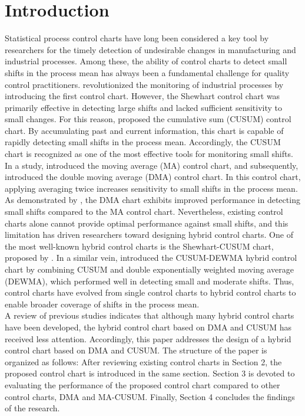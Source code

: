 \documentclass[twoside]{article}
\begin{document}
\section{Introduction}
\vspace{-0.3cm}
Statistical process control charts have long been considered a key tool by researchers for the timely detection of undesirable changes in manufacturing and industrial processes. Among these, the ability of control charts to detect small shifts in the process mean has always been a fundamental challenge for quality control practitioners.  \cite{shewhart1931} revolutionized the monitoring of industrial processes by introducing the first control chart. However, the Shewhart control chart was primarily effective in detecting large shifts and lacked sufficient sensitivity to small  changes.
For this reason, \cite{page1954} proposed the cumulative sum (CUSUM) control chart. By accumulating past and current information, this chart is capable of rapidly detecting small shifts in the process mean. Accordingly, the CUSUM chart is recognized as one of the most effective tools for monitoring small shifts.
In a study, \cite{khoo2004} introduced the moving average (MA) control chart, and subsequently,  \cite{khoo2008} introduced the double moving average (DMA) control chart. In this control chart, applying averaging twice increases sensitivity to small shifts in the process mean. As demonstrated by  \cite{saengsura2023}, the DMA chart exhibits improved performance in detecting small shifts compared to the MA control chart. Nevertheless, existing control charts alone cannot provide optimal performance against small shifts, and this limitation has driven researchers toward designing hybrid control charts. One of the most well-known hybrid control charts is the Shewhart-CUSUM chart, proposed by  \cite{karimi2019}. In a similar vein,  \cite{rahman2023} introduced the CUSUM-DEWMA hybrid control chart by combining CUSUM and double exponentially weighted moving average (DEWMA), which performed well in detecting small and moderate shifts.
Thus, control charts have evolved from single control charts to hybrid control charts to enable broader coverage of shifts in the process mean.
\\
A review of previous studies indicates that although many hybrid control charts have been developed, the hybrid control chart based on DMA and CUSUM has received less attention. Accordingly, this paper addresses the design of a hybrid control chart based on DMA and CUSUM. The structure of the paper is organized as follows: After reviewing existing control charts in Section 2, the proposed control chart is introduced in the same section. Section 3 is devoted to evaluating the performance of the proposed control chart compared to other control charts, DMA and MA-CUSUM. Finally, Section 4 concludes the findings of the research.
\vspace{-0.90cm}
\end{document}
